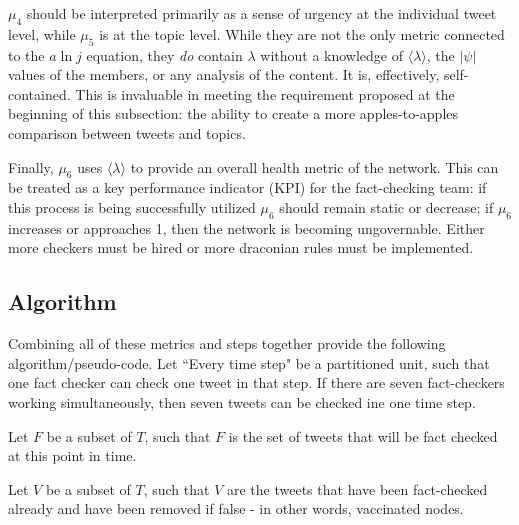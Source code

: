 \documentclass[preprint,review,12pt]{elsarticle}
\begin{document}
$\mu_4$ should be interpreted primarily as a sense of urgency at the individual tweet level, while $\mu_5$ is at the topic level. While they are not the only metric connected to the $a \ln j$ equation, they \textit{do} contain $\lambda$ without a knowledge of $\langle \lambda \rangle$, the $|\psi|$ values of the members, or any analysis of the content. It is, effectively, self-contained. This is invaluable in meeting the requirement proposed at the beginning of this subsection: the ability to create a more apples-to-apples comparison between tweets and topics. 

Finally, $\mu_6$ uses $\langle \lambda \rangle$ to provide an overall health metric of the network. This can be treated as a key performance indicator (KPI) for the fact-checking team: if this process is being successfully utilized $\mu_6$ should remain static or decrease; if $\mu_6$ increases or approaches 1, then the network is becoming ungovernable. Either more checkers must be hired or more draconian rules must be implemented.

\subsection{Algorithm}
Combining all of these metrics and steps together provide the following algorithm/pseudo-code. Let ``Every time step" be a partitioned unit, such that one fact checker can check one tweet in that step. If there are seven fact-checkers working simultaneously, then seven tweets can be checked ine one time step.

Let $F$ be a subset of $T$, such that $F$ is the set of tweets that will be fact checked at this point in time.

Let $V$ be a subset of $T$, such that $V$ are the tweets that have been fact-checked already and have been removed if false - in other words, vaccinated nodes.
\end{document}
